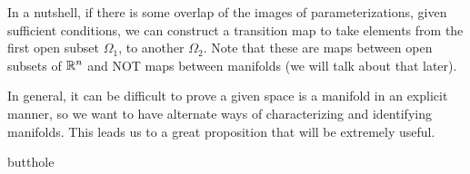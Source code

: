 In a nutshell, if there is some overlap of the images of parameterizations, given
sufficient conditions, we can construct a transition map to take elements from the
first open subset $\Omega_1$, to another $\Omega_2$. Note that these are maps between
open subsets of $\mathbb{R}^n$ and NOT maps between manifolds (we will talk about that later).

In general, it can be difficult to prove a given space is a manifold in an explicit
manner, so we want to have alternate ways of characterizing and identifying manifolds.
This leads us to a great proposition that will be extremely useful.

\begin{boxprop}{}{}
    butthole
\end{boxprop}